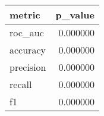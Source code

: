 \begin{tabular}{lr}
\toprule
metric & p_value \\
\midrule
roc_auc & 0.000000 \\
accuracy & 0.000000 \\
precision & 0.000000 \\
recall & 0.000000 \\
f1 & 0.000000 \\
\bottomrule
\end{tabular}
